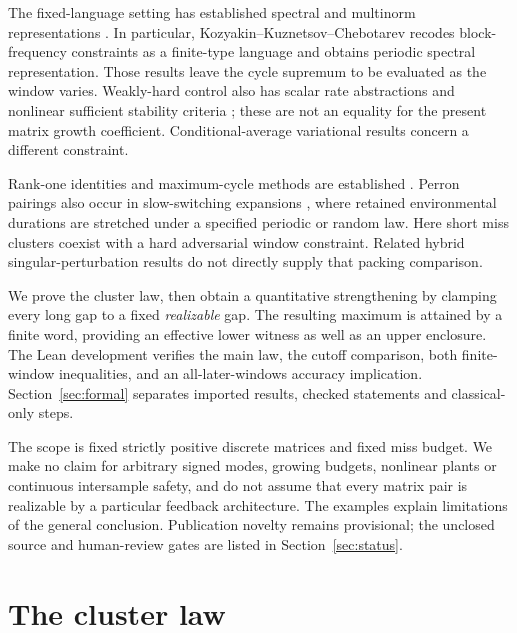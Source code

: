 \documentclass[11pt,letterpaper]{article}
\theoremstyle{remark}
\begin{document}
The fixed-language setting has established spectral and multinorm
representations \cite{kozyakin2014,kozyakin2019,philippe2016}. In particular,
Kozyakin--Kuznetsov--Chebotarev \cite[Sections 3.3--3.5]{kozyakin2019}
recodes block-frequency constraints as a finite-type language and obtains
periodic spectral representation. Those results leave the cycle supremum
to be evaluated as the window varies. Weakly-hard control also has scalar
rate abstractions \cite{gaukler2020} and nonlinear sufficient stability
criteria \cite{hertneck2020}; these are not an equality for the present
matrix growth coefficient. Conditional-average variational results
\cite{zhao2014} concern a different constraint.

Rank-one identities and maximum-cycle methods are established
\cite{ahmadi2012,liuxiao2013}. Perron pairings also occur in slow-switching
expansions \cite{monmarche2025}, where retained environmental durations
are stretched under a specified periodic or random law. Here short miss
clusters coexist with a hard adversarial window constraint. Related
hybrid singular-perturbation results \cite{haidar2026} do not directly
supply that packing comparison.

We prove the cluster law, then obtain a quantitative strengthening by
clamping every long gap to a fixed \emph{realizable} gap. The resulting
maximum is attained by a finite word, providing an effective lower witness
as well as an upper enclosure. The Lean development verifies the main
law, the cutoff comparison, both finite-window inequalities, and an
all-later-windows accuracy implication. Section~\ref{sec:formal}
separates imported results, checked statements and classical-only steps.

The scope is fixed strictly positive discrete matrices and fixed miss
budget. We make no claim for arbitrary signed modes, growing budgets,
nonlinear plants or continuous intersample safety, and do not assume that
every matrix pair is realizable by a particular feedback architecture.
The examples explain limitations of the general conclusion. Publication
novelty remains provisional; the unclosed source and human-review gates
are listed in Section~\ref{sec:status}.

\section{The cluster law}
\end{document}
